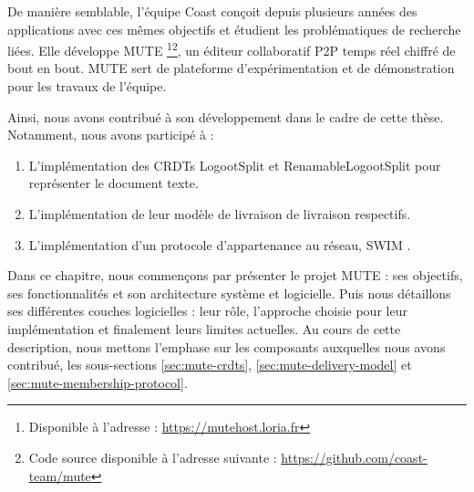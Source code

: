 
De manière semblable, l'équipe Coast conçoit depuis plusieurs années des applications avec ces mêmes objectifs et étudient les problématiques de recherche liées.
Elle développe \acf{MUTE} \cite{MUTE2017}\footnote{Disponible à l'adresse : \url{https://mutehost.loria.fr}}\footnote{Code source disponible à l'adresse suivante : \url{https://github.com/coast-team/mute}}, un éditeur collaboratif \ac{P2P} temps réel chiffré de bout en bout.
\ac{MUTE} sert de plateforme d'expérimentation et de démonstration pour les travaux de l'équipe.

Ainsi, nous avons contribué à son développement dans le cadre de cette thèse.
Notamment, nous avons participé à :
\begin{enumerate}
  \item L'implémentation des \acp{CRDT} LogootSplit \cite{2013-logootsplit} et RenamableLogootSplit \cite{2022-rls-tpds-nicolas} pour représenter le document texte.
  \item L'implémentation de leur modèle de livraison de livraison respectifs.
  \item L'implémentation d'un protocole d'appartenance au réseau, SWIM \cite{swim2002}.
\end{enumerate}

Dans ce chapitre, nous commençons par présenter le projet \ac{MUTE} : ses objectifs, ses fonctionnalités et son architecture système et logicielle.
Puis nous détaillons ses différentes couches logicielles : leur rôle, l'approche choisie pour leur implémentation et finalement leurs limites actuelles.
Au cours de cette description, nous mettons l'emphase sur les composants auxquelles nous avons contribué, \ie les sous-sections \ref{sec:mute-crdts}, \ref{sec:mute-delivery-model} et \ref{sec:mute-membership-protocol}.
